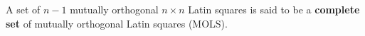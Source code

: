 A set of $n-1$ mutually orthogonal $n \times n$ Latin squares is said to be a \textbf{complete set} of mutually orthogonal Latin squares (MOLS).
